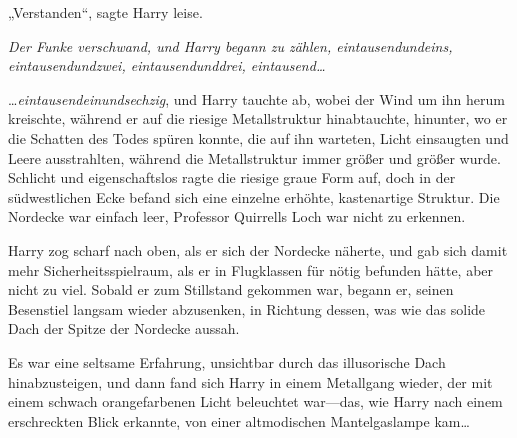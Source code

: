 „Verstanden“, sagte Harry leise.

\emph{Der Funke verschwand, und Harry begann zu zählen, \emph{eintausendundeins, eintausendundzwei, eintausendunddrei, eintausend…}}

…\emph{eintausendeinundsechzig}, und Harry tauchte ab, wobei der Wind um ihn herum kreischte, während er auf die riesige Metallstruktur hinabtauchte, hinunter, wo er die Schatten des Todes spüren konnte, die auf ihn warteten, Licht einsaugten und Leere ausstrahlten, während die Metallstruktur immer größer und größer wurde. Schlicht und eigenschaftslos ragte die riesige graue Form auf, doch in der südwestlichen Ecke befand sich eine einzelne erhöhte, kastenartige Struktur. Die Nordecke war einfach leer, Professor Quirrells Loch war nicht zu erkennen.

Harry zog scharf nach oben, als er sich der Nordecke näherte, und gab sich damit mehr Sicherheitsspielraum, als er in Flugklassen für nötig befunden hätte, aber nicht zu viel. Sobald er zum Stillstand gekommen war, begann er, seinen Besenstiel langsam wieder abzusenken, in Richtung dessen, was wie das solide Dach der Spitze der Nordecke aussah.

Es war eine seltsame Erfahrung, unsichtbar durch das illusorische Dach hinabzusteigen, und dann fand sich Harry in einem Metallgang wieder, der mit einem schwach orangefarbenen Licht beleuchtet war—das, wie Harry nach einem erschreckten Blick erkannte, von einer altmodischen Mantelgaslampe kam…

